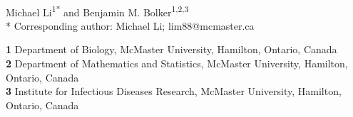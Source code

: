 \documentclass[12pt]{article}
\begin{document}
\begin{center}
{\Large
\textbf{} %
}
\\
\vspace{2pt}
Michael Li\textsuperscript{1*} and Benjamin M. Bolker\textsuperscript{1,2,3}
\\
\vspace{2pt}
* Corresponding author: Michael Li; lim88@mcmaster.ca
\end{center}
\vspace{5pt}
\textbf{1} Department of Biology, McMaster University, Hamilton, Ontario, Canada
\\
\textbf{2} Department of Mathematics and Statistics, McMaster University, Hamilton, Ontario, Canada
\\
\textbf{3} Institute for Infectious Diseases Research, McMaster University, Hamilton, Ontario, Canada
\\
\bigskip
% 
% 
% 
% 
% 
% 
% 
\end{document}
